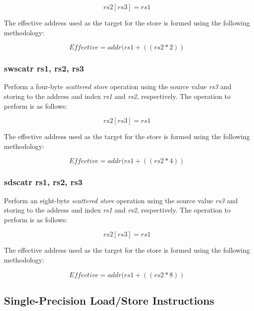 \documentclass{article}
\begin{document}
\begin{equation}
rs2[rs3] = rs1
\end{equation}

The effective address used as the target
for the store is formed using the following methodology:

\begin{equation}
Effective = addr(rs1 + ((rs2 * 2))
\end{equation}

\subsubsection{swscatr rs1, rs2, rs3}

Perform a four-byte \emph{scattered store} operation using the 
source value \emph{rs3} and storing to the address and index
\emph{rs1} and \emph{rs2}, respectively.  The operation to
perform is as follows: 

\begin{equation}
rs2[rs3] = rs1
\end{equation}

The effective address used as the target
for the store is formed using the following methodology:

\begin{equation}
Effective = addr(rs1 + ((rs2 * 4))
\end{equation}

\subsubsection{sdscatr rs1, rs2, rs3}

Perform an eight-byte \emph{scattered store} operation using the 
source value \emph{rs3} and storing to the address and index
\emph{rs1} and \emph{rs2}, respectively.  The operation to
perform is as follows: 

\begin{equation}
rs2[rs3] = rs1
\end{equation}

The effective address used as the target
for the store is formed using the following methodology:

\begin{equation}
Effective = addr(rs1 + ((rs2 * 8))
\end{equation}


\subsection{Single-Precision Load/Store Instructions}
\end{document}

